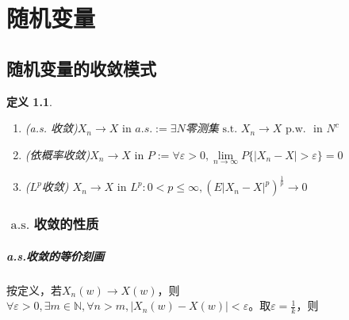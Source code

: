 \documentclass{ctexart}
\begin{document}
\newcommand{\R}{\mathbb{R}}
\newcommand{\N}{\mathbb{N}}
\newcommand{\dd}{\,\mathrm{d}}
\newcommand{\st}{\text{ s.t. }}
\newcommand{\pp}[2]{\frac{\partial #1}{\partial #2}}
\newcommand{\dif}[2]{\frac{\mathrm{d}#1}{\mathrm{d}#2}}
\newcommand{\nm}[1]{\left\|#1\right\|}
\newcommand{\dual}[1]{\left<#1\right>}
\newcommand{\wto}{\rightharpoonup}
\newcommand{\wsto}{\stackrel{*}{\rightharpoonup}}
\newcommand{\cvin}{\text{ in }}
\newcommand{\alev}{\text{ a.e. }}
\newcommand{\alsu}{\text{ a.s. }}
\newcommand{\E}{\mathcal{E}}
\newcommand{\F}{\mathscr{F}}
\newcommand{\G}{\mathscr{G}}
\newcommand{\Bor}{\mathscr{B}}
\newcommand{\pw}{\text{ p.w. }}
\newcommand{\inof}{\text{ i.o. }}
\newcommand{\X}{\bm{X}}
\newcommand{\iid}{\mathrm{i.i.d.}~}
\newcommand{\C}{\mathbb{C}}

\newtheorem{Thm}{定理}[section]
\newtheorem{Lemma}[Thm]{引理}
\newtheorem{Prop}[Thm]{命题}
\newtheorem{Cor}[Thm]{推论}
\newtheorem{Def}{定义}[section]
\newtheorem{Rmk}{注}[section]
\newtheorem{Eg}{例}[section]
\else
\chapter{随机变量}
\fi
\section{随机变量的收敛模式}
\begin{Def}
  \begin{enumerate}
  \item (a.s. 收敛)$X_{n}\to X\cvin a.s.:=\exists N$零测集$\st X_{n}\to X \pw\cvin N^{c}$
  \item (依概率收敛)$X_{n}\to X\cvin P:= \forall\varepsilon>0,\lim\limits_{n\to\infty}P\{|X_{n}-X|>\varepsilon\}=0$
  \item ($L^{p}$收敛) $X_{n}\to X\cvin L^{p}:0<p\leq \infty, (E|X_{n}-X|^{p})^{\frac 1 p}\to 0 $
  \end{enumerate}
\end{Def}

\subsection{$\alsu$收敛的性质}
\paragraph{a.s.收敛的等价刻画}
按定义，若$X_{n}(w)\to X(w)$，则$\forall\varepsilon>0,\exists m\in\N,\forall n>m, |X_{n}(w)-X(w)|<\varepsilon$。取$\varepsilon=\frac{1}{k}$，则
\end{document}
